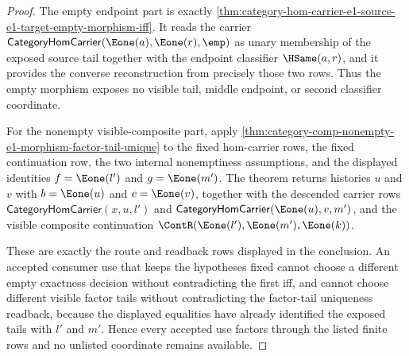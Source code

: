 \begin{proof}
The empty endpoint part is exactly
\autoref{thm:category-hom-carrier-e1-source-e1-target-empty-morphism-iff}.
It reads the carrier
$\mathsf{CategoryHomCarrier}(\Eone(a),\Eone(r),\emp)$ as unary membership of
the exposed source tail together with the endpoint classifier $\HSame(a,r)$,
and it provides the converse reconstruction from precisely those two rows.
Thus the empty morphism exposes no visible tail, middle endpoint, or second
classifier coordinate.

For the nonempty visible-composite part, apply
\autoref{thm:category-comp-nonempty-e1-morphism-factor-tail-unique} to the
fixed hom-carrier rows, the fixed continuation row, the two internal
nonemptiness assumptions, and the displayed identities $f=\Eone(l')$ and
$g=\Eone(m')$. The theorem returns histories $u$ and $v$ with
$b=\Eone(u)$ and $c=\Eone(v)$, together with the descended carrier rows
$\mathsf{CategoryHomCarrier}(x,u,l')$ and
$\mathsf{CategoryHomCarrier}(\Eone(u),v,m')$, and the visible composite
continuation $\ContR(\Eone(l'),\Eone(m'),\Eone(k))$.

These are exactly the route and readback rows displayed in the conclusion. An
accepted consumer use that keeps the hypotheses fixed cannot choose a different
empty exactness decision without contradicting the first iff, and cannot choose
different visible factor tails without contradicting the factor-tail uniqueness
readback, because the displayed equalities have already identified the exposed
tails with $l'$ and $m'$. Hence every accepted use factors through the listed
finite rows and no unlisted coordinate remains available.
\end{proof}
